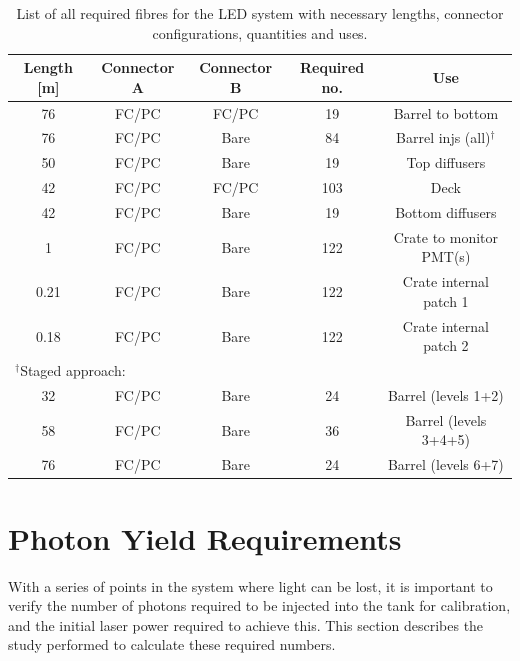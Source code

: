 \documentclass[a4paper,11pt]{article}
\begin{document}
\begin{table}[h]
\centering
\setlength{\tabcolsep}{4pt}
\begin{tabular}{ccccc}
\toprule
Length [m]	&	Connector A	&	Connector B	&	Required no.	&	Use		\\ \midrule
76			&	FC/PC		&	FC/PC		&	19				&	Barrel to bottom	\\
76			&	FC/PC		&	Bare		&	84				&	Barrel injs (all)$^\dagger$	\\
50			&	FC/PC		&	Bare		&	19				&	Top diffusers \\
42			&	FC/PC		&	FC/PC		&	103				&	Deck		\\
42			&	FC/PC		&	Bare		&	19				&	Bottom diffusers	\\
1			&	FC/PC		&	Bare		&	122				&	Crate to monitor PMT(s)	\\
0.21		&	FC/PC		&	Bare		&	122				&	Crate internal patch 1	\\
0.18		&	FC/PC		&	Bare		&	122				&	Crate internal patch 2 \\ \midrule
\multicolumn{3}{l}{$^\dagger$Staged approach:}			&					&			\\
32			&	FC/PC		&	Bare		&	24				&	Barrel (levels 1+2) \\
58			&	FC/PC		&	Bare		&	36				&	Barrel (levels 3+4+5)	\\
76			&	FC/PC		&	Bare		&	24				&	Barrel (levels 6+7)	\\
\bottomrule
\end{tabular}
\caption{List of all required fibres for the LED system with necessary lengths, connector configurations, quantities and uses.}\label{tab:fibreSummaryLED}
\end{table}



\clearpage

\section{Photon Yield Requirements}\label{sec:photonreq}

With a series of points in the system where light can be lost, it is important to verify the number of photons required to be injected into the tank for calibration, and the initial laser power required to achieve this. This section describes the study performed to calculate these required numbers.
\end{document}
